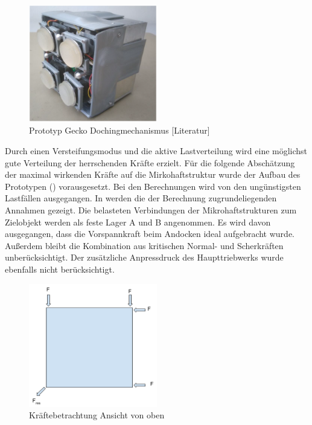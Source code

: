 \begin{figure}[h]
	\centering
		\includegraphics[width=0.50\textwidth]{graphics/Gecko3.PNG}
	\caption{Prototyp Gecko Dochingmechanismus [Literatur]}
	\label{fig:Gecko3}
\end{figure}


Durch einen Versteifungsmodus und die aktive Lastverteilung wird eine möglichst gute Verteilung der herrschenden Kräfte erzielt. 
Für die folgende Abschätzung der maximal wirkenden Kräfte auf die Mirkohaftstruktur wurde der Aufbau des Prototypen () vorausgesetzt. Bei den Berechnungen wird von den ungünstigsten Lastfällen ausgegangen.
In  werden die der Berechnung zugrundeliegenden Annahmen gezeigt. Die belasteten Verbindungen der Mikrohaftstrukturen zum Zielobjekt werden als feste Lager A und B angenommen. Es wird davon ausgegangen, dass die Vorspannkraft beim Andocken ideal aufgebracht wurde. Außerdem bleibt die Kombination aus kritischen Normal- und Scherkräften unberücksichtigt. Der zusätzliche Anpressdruck des Haupttriebwerks wurde ebenfalls nicht berücksichtigt.

\begin{figure}[h]
	\centering
		\includegraphics[width=0.50\textwidth]{graphics/Gecko_Rechnung1.png}
	\caption{Kräftebetrachtung Ansicht von oben}
	\label{fig:Gecko_Rechnung1}
\end{figure}

